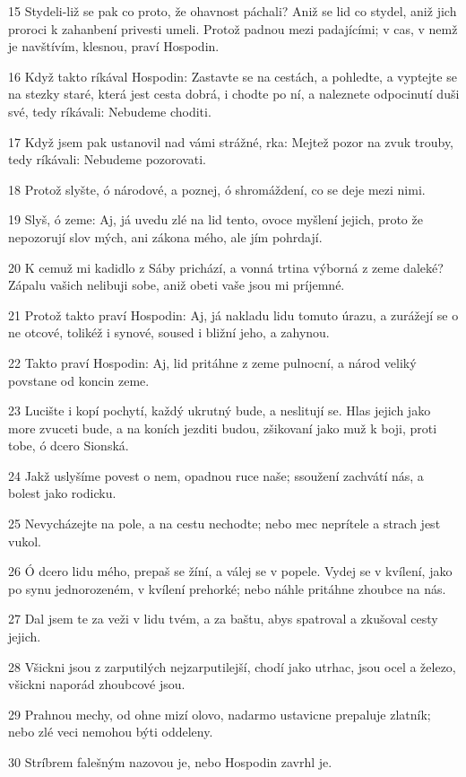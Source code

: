 \par 15 Stydeli-liž se pak co proto, že ohavnost páchali? Aniž se lid co stydel, aniž jich proroci k zahanbení privesti umeli. Protož padnou mezi padajícími; v cas, v nemž je navštívím, klesnou, praví Hospodin.
\par 16 Když takto ríkával Hospodin: Zastavte se na cestách, a pohledte, a vyptejte se na stezky staré, která jest cesta dobrá, i chodte po ní, a naleznete odpocinutí duši své, tedy ríkávali: Nebudeme choditi.
\par 17 Když jsem pak ustanovil nad vámi strážné, rka: Mejtež pozor na zvuk trouby, tedy ríkávali: Nebudeme pozorovati.
\par 18 Protož slyšte, ó národové, a poznej, ó shromáždení, co se deje mezi nimi.
\par 19 Slyš, ó zeme: Aj, já uvedu zlé na lid tento, ovoce myšlení jejich, proto že nepozorují slov mých, ani zákona mého, ale jím pohrdají.
\par 20 K cemuž mi kadidlo z Sáby prichází, a vonná trtina výborná z zeme daleké? Zápalu vašich nelibuji sobe, aniž obeti vaše jsou mi príjemné.
\par 21 Protož takto praví Hospodin: Aj, já nakladu lidu tomuto úrazu, a zurážejí se o ne otcové, tolikéž i synové, soused i bližní jeho, a zahynou.
\par 22 Takto praví Hospodin: Aj, lid pritáhne z zeme pulnocní, a národ veliký povstane od koncin zeme.
\par 23 Lucište i kopí pochytí, každý ukrutný bude, a neslitují se. Hlas jejich jako more zvuceti bude, a na koních jezditi budou, zšikovaní jako muž k boji, proti tobe, ó dcero Sionská.
\par 24 Jakž uslyšíme povest o nem, opadnou ruce naše; ssoužení zachvátí nás, a bolest jako rodicku.
\par 25 Nevycházejte na pole, a na cestu nechodte; nebo mec neprítele a strach jest vukol.
\par 26 Ó dcero lidu mého, prepaš se žíní, a válej se v popele. Vydej se v kvílení, jako po synu jednorozeném, v kvílení prehorké; nebo náhle pritáhne zhoubce na nás.
\par 27 Dal jsem te za veži v lidu tvém, a za baštu, abys spatroval a zkušoval cesty jejich.
\par 28 Všickni jsou z zarputilých nejzarputilejší, chodí jako utrhac, jsou ocel a železo, všickni naporád zhoubcové jsou.
\par 29 Prahnou mechy, od ohne mizí olovo, nadarmo ustavicne prepaluje zlatník; nebo zlé veci nemohou býti oddeleny.
\par 30 Stríbrem falešným nazovou je, nebo Hospodin zavrhl je.

